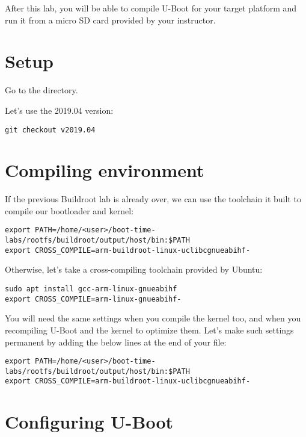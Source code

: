 
After this lab, you will be able to compile U-Boot for your target
platform and run it from a micro SD card provided by your instructor.

\section{Setup}

Go to the  directory.

Let's use the 2019.04 version:
\begin{verbatim}
git checkout v2019.04
\end{verbatim}

\section{Compiling environment}

If the previous Buildroot lab is already over, we can use the
toolchain it built to compile our bootloader and kernel:

\begin{verbatim}
export PATH=/home/<user>/boot-time-labs/rootfs/buildroot/output/host/bin:$PATH
export CROSS_COMPILE=arm-buildroot-linux-uclibcgnueabihf-
\end{verbatim}

Otherwise, let's take a cross-compiling toolchain provided by Ubuntu:

\begin{verbatim}
sudo apt install gcc-arm-linux-gnueabihf
export CROSS_COMPILE=arm-linux-gnueabihf-
\end{verbatim}

You will need the same settings when you compile the kernel too, and
when you recompiling U-Boot and the kernel to optimize them. Let's make
such settings permanent by adding the below lines at the end of your
 file:

\begin{verbatim}
export PATH=/home/<user>/boot-time-labs/rootfs/buildroot/output/host/bin:$PATH
export CROSS_COMPILE=arm-buildroot-linux-uclibcgnueabihf-
\end{verbatim}

\section{Configuring U-Boot}

